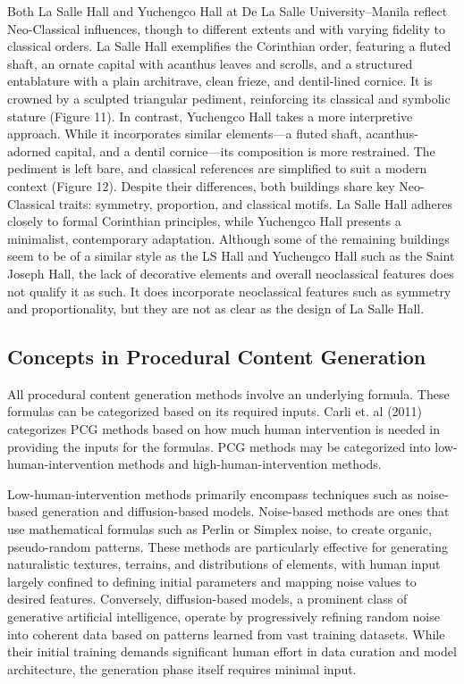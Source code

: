 \documentclass[manuscript,screen,12pt]{article}
\begin{document}
Both La Salle Hall and Yuchengco Hall at De La Salle University–Manila reflect Neo-Classical influences, though to different extents and with varying fidelity to classical orders. La Salle Hall exemplifies the Corinthian order, featuring a fluted shaft, an ornate capital with acanthus leaves and scrolls, and a structured entablature with a plain architrave, clean frieze, and dentil-lined cornice. It is crowned by a sculpted triangular pediment, reinforcing its classical and symbolic stature (Figure 11). In contrast, Yuchengco Hall takes a more interpretive approach. While it incorporates similar elements—a fluted shaft, acanthus-adorned capital, and a dentil cornice—its composition is more restrained. The pediment is left bare, and classical references are simplified to suit a modern context (Figure 12). Despite their differences, both buildings share key Neo-Classical traits: symmetry, proportion, and classical motifs. La Salle Hall adheres closely to formal Corinthian principles, while Yuchengco Hall presents a minimalist, contemporary adaptation. Although some of the remaining buildings seem to be of a similar style as the LS Hall and Yuchengco Hall such as the Saint Joseph Hall, the lack of decorative elements and overall neoclassical features does not qualify it as such. It does incorporate neoclassical features such as symmetry and proportionality, but they are not as clear as the design of La Salle Hall. 

\subsection{Concepts in Procedural Content Generation}
All procedural content generation methods involve an underlying formula. These formulas can be categorized based on its required inputs. Carli et. al (2011) categorizes PCG methods based on how much human intervention is needed in providing the inputs for the formulas. PCG methods may be categorized into low-human-intervention methods and high-human-intervention methods.

Low-human-intervention methods primarily encompass techniques such as noise-based generation and diffusion-based models. Noise-based methods are ones that use mathematical formulas such as Perlin or Simplex noise, to create organic, pseudo-random patterns. These methods are particularly effective for generating naturalistic textures, terrains, and distributions of elements, with human input largely confined to defining initial parameters and mapping noise values to desired features. Conversely, diffusion-based models, a prominent class of generative artificial intelligence, operate by progressively refining random noise into coherent data based on patterns learned from vast training datasets. While their initial training demands significant human effort in data curation and model architecture, the generation phase itself requires minimal input.
\end{document}
